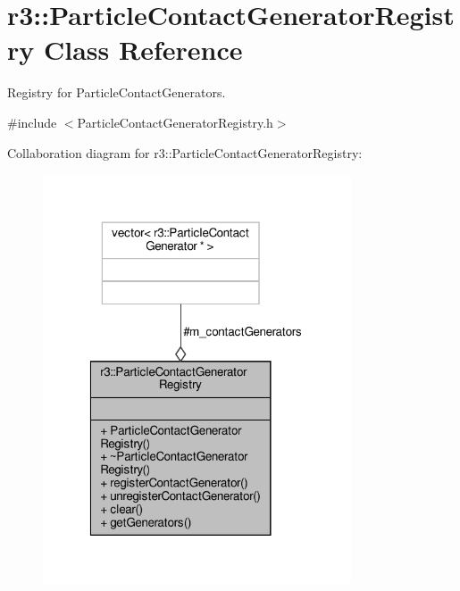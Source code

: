 \hypertarget{classr3_1_1_particle_contact_generator_registry}{}\section{r3\+:\+:Particle\+Contact\+Generator\+Registry Class Reference}
\label{classr3_1_1_particle_contact_generator_registry}


Registry for Particle\+Contact\+Generators.  




{\ttfamily \#include $<$Particle\+Contact\+Generator\+Registry.\+h$>$}



Collaboration diagram for r3\+:\+:Particle\+Contact\+Generator\+Registry\+:\nopagebreak
\begin{figure}[H]
\begin{center}
\leavevmode
\includegraphics[width=259pt]{classr3_1_1_particle_contact_generator_registry__coll__graph}
\end{center}
\end{figure}
